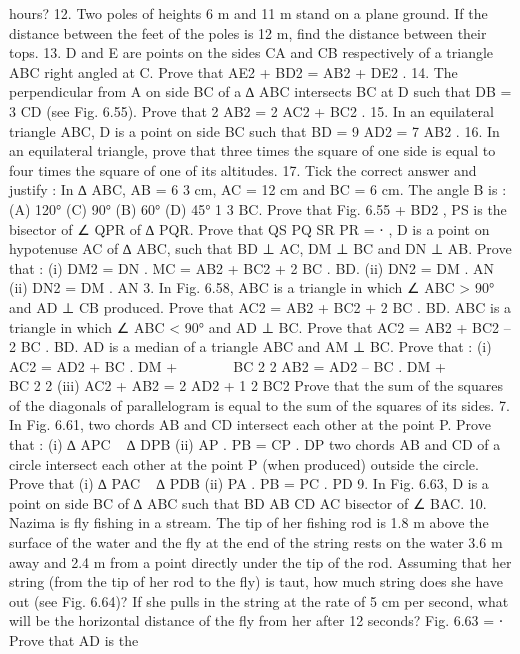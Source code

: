 \begin{enumerate}[label=\arabic*.,ref=\thesubsection.\theenumi]
hours?
12. Two poles of heights 6 m and 11 m stand on a plane ground. If the distance between the feet of the poles is 12 m, find the distance between their tops.
13. D and E are points on the sides CA and CB respectively of a triangle ABC right angled at C. Prove that AE2
+ BD2 = AB2 + DE2 .
14. The perpendicular from A on side BC of a ∆ ABC intersects BC at D such that DB = 3 CD (see Fig. 6.55). Prove that 2 AB2
= 2 AC2 + BC2 .
15. In an equilateral triangle ABC, D is a point on side BC such that BD = 9 AD2
= 7 AB2 .
16. In an equilateral triangle, prove that three times the square of one side is equal to four times the square of one of its altitudes.
17. Tick the correct answer and justify : In ∆ ABC, AB = 6 3 cm, AC = 12 cm and BC = 6 cm. The angle B is : (A) 120°
(C) 90°
(B) 60° (D) 45°
1 3
BC. Prove that Fig. 6.55 + BD2
, PS is the bisector of ∠ QPR of ∆ PQR. Prove that
QS PQ SR PR
= ⋅
, D is a point on hypotenuse AC of ∆ ABC, such that BD ⊥ AC, DM ⊥ BC and DN ⊥ AB. Prove that :
(i) DM2 = DN . MC = AB2 + BC2 + 2 BC . BD. (ii) DN2 = DM . AN
 (ii) DN2 = DM . AN
3. In Fig. 6.58, ABC is a triangle in which ∠ ABC > 90° and AD ⊥ CB produced. Prove that AC2
= AB2 + BC2 + 2 BC . BD.
ABC is a triangle in which ∠ ABC < 90° and AD ⊥ BC. Prove that AC2
= AB2 + BC2 – 2 BC . BD.
AD is a median of a triangle ABC and AM ⊥ BC. Prove that :
(i) AC2 = AD2 + BC . DM +
     
BC 2
2
AB2 = AD2 – BC . DM +
     
BC 2
2 (iii) AC2 + AB2 = 2 AD2 +
1 2
BC2
Prove that the sum of the squares of the diagonals of parallelogram is equal to the sum of the squares of its sides.
7. In Fig. 6.61, two chords AB and CD intersect each other at the point P. Prove that : (i) ∆ APC ~ ∆ DPB
(ii) AP . PB = CP . DP
two chords AB and CD of a circle intersect each other at the point P (when produced) outside the circle. Prove that (i) ∆ PAC ~ ∆ PDB
(ii) PA . PB = PC . PD
9. In Fig. 6.63, D is a point on side BC of ∆ ABC such that
BD AB CD AC
bisector of ∠ BAC.
10. Nazima is fly fishing in a stream. The tip of her fishing rod is 1.8 m above the surface of the water and the fly at the end of the string rests on the water 3.6 m away and 2.4 m from a point directly under the tip of the rod. Assuming that her string (from the tip of her rod to the fly) is taut, how much string does she have out (see Fig. 6.64)? If she pulls in the string at the rate of 5 cm per second, what will be the horizontal distance of the fly from her after 12 seconds?
Fig. 6.63 = ⋅ Prove that AD is the
\end{enumerate}


